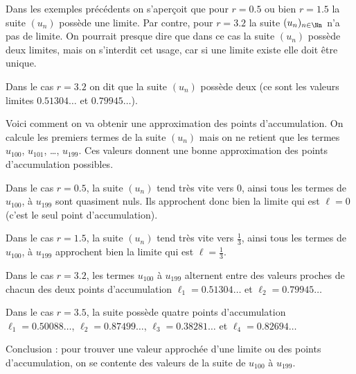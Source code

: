 \documentclass[11pt,class=report,crop=false]{standalone}
\begin{document}
\begin{cours}
Dans les exemples précédents on s'aperçoit que pour $r=0.5$ ou bien $r=1.5$ la suite $(u_n)$ possède une limite. Par contre, pour $r=3.2$ la suite $(u_n)_{n\in\Nn}$ n'a pas de limite. 
On pourrait presque dire que dans ce cas la suite $(u_n)$ possède deux limites, mais on s'interdit cet usage, car si une limite existe elle doit être unique.

Dans le cas $r=3.2$ on dit que la suite $(u_n)$ possède deux  (ce sont les valeurs \og{}limites\fg{} $0.51304\ldots$ et $0.79945\ldots$).

Voici comment on va obtenir une approximation des points d'accumulation.
On calcule les premiers termes de la suite $(u_n)$ mais on ne retient que les termes $u_{100}$,
$u_{101}$, \ldots, $u_{199}$. Ces valeurs donnent une bonne approximation des points d'accumulation possibles.


Dans le cas $r=0.5$, la suite $(u_n)$ tend très vite vers $0$, ainsi tous les termes de $u_{100}$,
à $u_{199}$ sont quasiment nuls. Ils approchent donc bien la limite qui est $\ell=0$ (c'est le seul point d'accumulation).


Dans le cas $r=1.5$, la suite $(u_n)$ tend très vite vers $\frac13$, ainsi tous les termes de $u_{100}$, à $u_{199}$ approchent bien la limite qui est $\ell=\frac13$.


Dans le cas $r=3.2$, les termes $u_{100}$ à $u_{199}$ alternent entre des valeurs
proches de chacun des deux points d'accumulation $\ell_1=0.51304\ldots$ et $\ell_2=0.79945\ldots$


Dans le cas $r=3.5$, la suite possède quatre points d'accumulation 
$\ell_1=0.50088\ldots$, $\ell_2=0.87499\ldots$,
$\ell_3=0.38281\ldots$ et $\ell_4=0.82694\ldots$

Conclusion : pour trouver une valeur approchée d'une limite ou des points d'accumulation, on se contente des valeurs de la suite de $u_{100}$ à $u_{199}$.

\end{cours}

\end{document}
